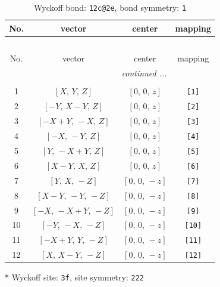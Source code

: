 \documentclass[fleqn,8pt]{jsarticle}
\begin{document}
\renewcommand{\arraystretch}{1.2}
\begin{longtable}{cccc}
\caption{Wyckoff bond: {\tt 12c@2e}, bond symmetry: {\tt 1}}
 \\
 \hline \hline
No. & vector & center & mapping \\ \hline \endfirsthead

\multicolumn{3}{l}{\tablename\ \thetable{}} \\
 \hline \hline
No. & vector & center & mapping \\ \hline \endhead

 \hline \hline
\multicolumn{3}{r}{\footnotesize\it continued ...} \\ \endfoot

 \hline \hline
\multicolumn{3}{r}{} \\ \endlastfoot

1 & $\left[ X,\, Y,\, Z \right]$ & $\left[ 0,\, 0,\, z \right]$ & {\tt [1]} \\ \hline
2 & $\left[ - Y,\, X - Y,\, Z \right]$ & $\left[ 0,\, 0,\, z \right]$ & {\tt [2]} \\ \hline
3 & $\left[ - X + Y,\, - X,\, Z \right]$ & $\left[ 0,\, 0,\, z \right]$ & {\tt [3]} \\ \hline
4 & $\left[ - X,\, - Y,\, Z \right]$ & $\left[ 0,\, 0,\, z \right]$ & {\tt [4]} \\ \hline
5 & $\left[ Y,\, - X + Y,\, Z \right]$ & $\left[ 0,\, 0,\, z \right]$ & {\tt [5]} \\ \hline
6 & $\left[ X - Y,\, X,\, Z \right]$ & $\left[ 0,\, 0,\, z \right]$ & {\tt [6]} \\ \hline
7 & $\left[ Y,\, X,\, - Z \right]$ & $\left[ 0,\, 0,\, - z \right]$ & {\tt [7]} \\ \hline
8 & $\left[ X - Y,\, - Y,\, - Z \right]$ & $\left[ 0,\, 0,\, - z \right]$ & {\tt [8]} \\ \hline
9 & $\left[ - X,\, - X + Y,\, - Z \right]$ & $\left[ 0,\, 0,\, - z \right]$ & {\tt [9]} \\ \hline
10 & $\left[ - Y,\, - X,\, - Z \right]$ & $\left[ 0,\, 0,\, - z \right]$ & {\tt [10]} \\ \hline
11 & $\left[ - X + Y,\, Y,\, - Z \right]$ & $\left[ 0,\, 0,\, - z \right]$ & {\tt [11]} \\ \hline
12 & $\left[ X,\, X - Y,\, - Z \right]$ & $\left[ 0,\, 0,\, - z \right]$ & {\tt [12]} \\
\end{longtable}
* Wyckoff site: {\tt 3f}, site symmetry: {\tt 222}
\renewcommand{\arraystretch}{1.2}
\end{document}
